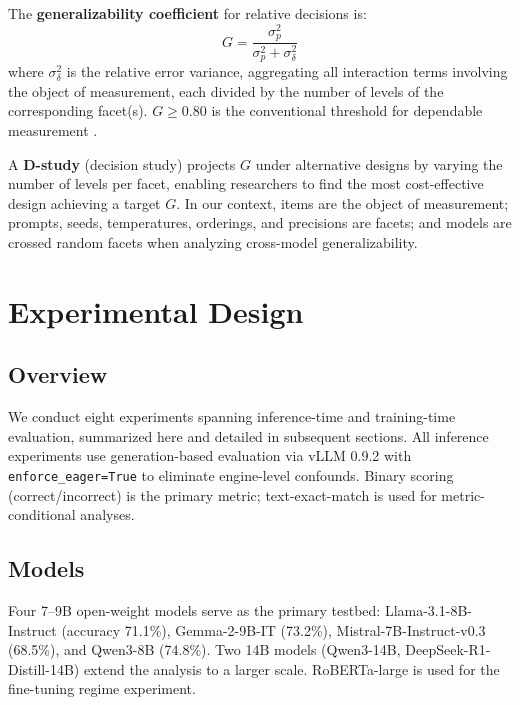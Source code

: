 \documentclass[letterpaper]{article}
\newcommand{\gcoeff}{\ensuremath{G}}
\newcommand{\pct}{\%}
\begin{document}
The \textbf{generalizability coefficient} for relative decisions is:
\begin{equation}
    \gcoeff{} = \frac{\sigma^2_p}{\sigma^2_p + \sigma^2_\delta}
\end{equation}
where $\sigma^2_\delta$ is the relative error variance, aggregating all interaction terms involving the object of measurement, each divided by the number of levels of the corresponding facet(s).
$\gcoeff{} \geq 0.80$ is the conventional threshold for dependable measurement \citep{shavelson1991}.

A \textbf{D-study} (decision study) projects $\gcoeff{}$ under alternative designs by varying the number of levels per facet, enabling researchers to find the most cost-effective design achieving a target $\gcoeff{}$.
In our context, items are the object of measurement; prompts, seeds, temperatures, orderings, and precisions are facets; and models are crossed random facets when analyzing cross-model generalizability.

\section{Experimental Design}

\subsection{Overview}

We conduct eight experiments spanning inference-time and training-time evaluation, summarized here and detailed in subsequent sections.
All inference experiments use generation-based evaluation \citep{hua2025} via vLLM 0.9.2 with \texttt{enforce\_eager=True} to eliminate engine-level confounds.
Binary scoring (correct/incorrect) is the primary metric; text-exact-match is used for metric-conditional analyses.

\subsection{Models}

Four 7--9B open-weight models serve as the primary testbed: Llama-3.1-8B-Instruct (accuracy 71.1\pct{}), Gemma-2-9B-IT (73.2\pct{}), Mistral-7B-Instruct-v0.3 (68.5\pct{}), and Qwen3-8B (74.8\pct{}).
Two 14B models (Qwen3-14B, DeepSeek-R1-Distill-14B) extend the analysis to a larger scale.
RoBERTa-large is used for the fine-tuning regime experiment.
\end{document}
